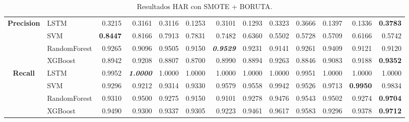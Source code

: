 \begin{table}[H]
\begin{adjustbox}{max width=12cm}
\begin{tabular}{|c|l|r|r|r|r|r|r|r|r|r|r|r|}
			\hline
			\textbf{Precision} &  LSTM &  0.3215 &  0.3161 &  0.3116 &  0.1253 &  0.3101 &  0.1293 &  0.3323 &  0.3666 &  0.1397 &  0.1336 & \textbf{  0.3783 } \\
			&  SVM & \textbf{  0.8447 } &  0.8166 &  0.7913 &  0.7831 &  0.7482 &  0.6360 &  0.5502 &  0.5728 &  0.5709 &  0.6166 &  0.5742 \\
			&  RandomForest &  0.9265 &  0.9096 &  0.9505 &  0.9150 & \textit{ \textbf{  0.9529 } } &  0.9231 &  0.9141 &  0.9261 &  0.9409 &  0.9121 &  0.9120 \\
			&  XGBoost &  0.8942 &  0.9208 &  0.8807 &  0.8700 &  0.8990 &  0.8894 &  0.9263 &  0.8846 &  0.9083 &  0.9188 & \textbf{  0.9352 } \\
			\hline
			\textbf{Recall} &  LSTM &  0.9952 & \textit{ \textbf{  1.0000 } } &  1.0000 &  1.0000 &  1.0000 &  1.0000 &  1.0000 &  0.9951 &  1.0000 &  1.0000 &  1.0000 \\
			&  SVM &  0.9296 &  0.9212 &  0.9314 &  0.9330 &  0.9579 &  0.9558 &  0.9942 &  0.9526 &  0.9713 & \textbf{  0.9950 } &  0.9834 \\
			&  RandomForest &  0.9310 &  0.9500 &  0.9275 &  0.9150 &  0.9101 &  0.9278 &  0.9476 &  0.9543 &  0.9502 &  0.9274 & \textbf{  0.9704 } \\
			&  XGBoost &  0.9490 &  0.9300 &  0.9337 &  0.9305 &  0.9223 &  0.9461 &  0.9617 &  0.9583 &  0.9296 &  0.9378 & \textbf{  0.9712 } \\
			\hline
		\end{tabular}
	\end{adjustbox}
	\caption{Resultados HAR con SMOTE + BORUTA.}
	\label{tab:HAR_SMOTE_BORUTA}
\end{table}

